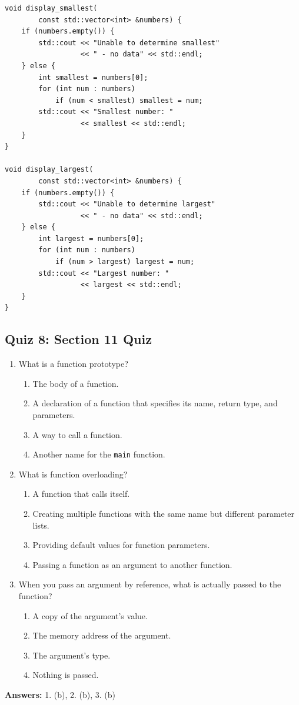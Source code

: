 \begin{lstlisting}
void display_smallest(
		const std::vector<int> &numbers) {
	if (numbers.empty()) {
		std::cout << "Unable to determine smallest"
		          << " - no data" << std::endl;
	} else {
		int smallest = numbers[0];
		for (int num : numbers)
			if (num < smallest) smallest = num;
		std::cout << "Smallest number: "
		          << smallest << std::endl;
	}
}

void display_largest(
		const std::vector<int> &numbers) {
	if (numbers.empty()) {
		std::cout << "Unable to determine largest"
		          << " - no data" << std::endl;
	} else {
		int largest = numbers[0];
		for (int num : numbers)
			if (num > largest) largest = num;
		std::cout << "Largest number: "
		          << largest << std::endl;
	}
}
\end{lstlisting}

\subsection{Quiz 8: Section 11 Quiz}
\begin{enumerate}
    \item What is a function prototype?
    \begin{enumerate}
        \item[a)] The body of a function.
        \item[b)] A declaration of a function that specifies its name, return type, and parameters.
        \item[c)] A way to call a function.
        \item[d)] Another name for the \texttt{main} function.
    \end{enumerate}

    \item What is function overloading?
    \begin{enumerate}
        \item[a)] A function that calls itself.
        \item[b)] Creating multiple functions with the same name but different parameter lists.
        \item[c)] Providing default values for function parameters.
        \item[d)] Passing a function as an argument to another function.
    \end{enumerate}

    \item When you pass an argument by reference, what is actually passed to the function?
    \begin{enumerate}
        \item[a)] A copy of the argument's value.
        \item[b)] The memory address of the argument.
        \item[c)] The argument's type.
        \item[d)] Nothing is passed.
    \end{enumerate}
\end{enumerate}

\textbf{Answers:} 1. (b), 2. (b), 3. (b)
